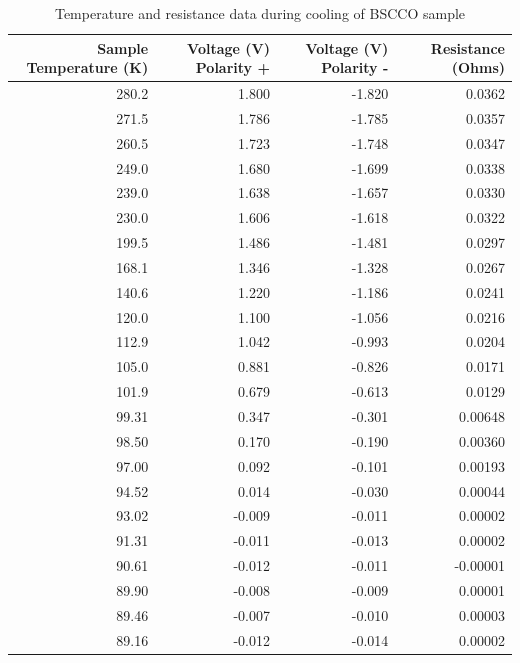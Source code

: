 \documentclass[12pt]{article}
\begin{document}
\begin{table}[htbp]
\caption{Temperature and resistance data during cooling of BSCCO sample}
\centering
\begin{tabular}{rrrr}
Sample Temperature (K) & Voltage (V) Polarity + & Voltage (V) Polarity - & Resistance (Ohms)\\
\hline
280.2 & 1.800 & -1.820 & 0.0362\\
271.5 & 1.786 & -1.785 & 0.0357\\
260.5 & 1.723 & -1.748 & 0.0347\\
249.0 & 1.680 & -1.699 & 0.0338\\
239.0 & 1.638 & -1.657 & 0.0330\\
230.0 & 1.606 & -1.618 & 0.0322\\
199.5 & 1.486 & -1.481 & 0.0297\\
168.1 & 1.346 & -1.328 & 0.0267\\
140.6 & 1.220 & -1.186 & 0.0241\\
120.0 & 1.100 & -1.056 & 0.0216\\
112.9 & 1.042 & -0.993 & 0.0204\\
105.0 & 0.881 & -0.826 & 0.0171\\
101.9 & 0.679 & -0.613 & 0.0129\\
99.31 & 0.347 & -0.301 & 0.00648\\
98.50 & 0.170 & -0.190 & 0.00360\\
97.00 & 0.092 & -0.101 & 0.00193\\
94.52 & 0.014 & -0.030 & 0.00044\\
93.02 & -0.009 & -0.011 & 0.00002\\
91.31 & -0.011 & -0.013 & 0.00002\\
90.61 & -0.012 & -0.011 & -0.00001\\
89.90 & -0.008 & -0.009 & 0.00001\\
89.46 & -0.007 & -0.010 & 0.00003\\
89.16 & -0.012 & -0.014 & 0.00002\\
\end{tabular}
\end{table}
\end{document}

